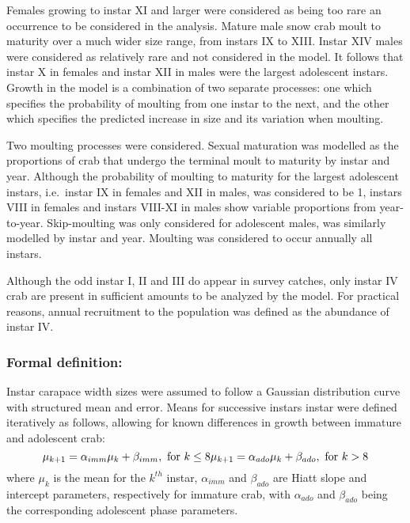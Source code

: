 \documentclass[
]{article}
\begin{document}
Females growing to instar XI and larger were considered as being too
rare an occurrence to be considered in the analysis. Mature male snow
crab moult to maturity over a much wider size range, from instars IX to
XIII. Instar XIV males were considered as relatively rare and not
considered in the model. It follows that instar X in females and instar
XII in males were the largest adolescent instars. Growth in the model is
a combination of two separate processes: one which specifies the
probability of moulting from one instar to the next, and the other which
specifies the predicted increase in size and its variation when
moulting.

Two moulting processes were considered. Sexual maturation was modelled
as the proportions of crab that undergo the terminal moult to maturity
by instar and year. Although the probability of moulting to maturity for
the largest adolescent instars, i.e.~instar IX in females and XII in
males, was considered to be 1, instars VIII in females and instars
VIII-XI in males show variable proportions from year-to-year.
Skip-moulting was only considered for adolescent males, was similarly
modelled by instar and year. Moulting was considered to occur annually
all instars.

Although the odd instar I, II and III do appear in survey catches, only
instar IV crab are present in sufficient amounts to be analyzed by the
model. For practical reasons, annual recruitment to the population was
defined as the abundance of instar IV.

\hypertarget{formal-definition}{%
\subsubsection{Formal definition:}\label{formal-definition}}

Instar carapace width sizes were assumed to follow a Gaussian
distribution curve with structured mean and error. Means for successive
instars instar were defined iteratively as follows, allowing for known
differences in growth between immature and adolescent crab: \[
   \mu_{k+1} = \alpha_{imm}\mu_{k} + \beta_{imm}, \text{ for }  k \le 8  \\
   \mu_{k+1} = \alpha_{ado}\mu_{k} + \beta_{ado}, \text{ for }  k > 8  \\
\] where \(\mu_{k}\) is the mean for the \(k^{th}\) instar,
\(\alpha_{imm}\) and \(\beta_{ado}\) are Hiatt slope and intercept
parameters, respectively for immature crab, with \(\alpha_{ado}\) and
\(\beta_{ado}\) being the corresponding adolescent phase parameters.
\end{document}

